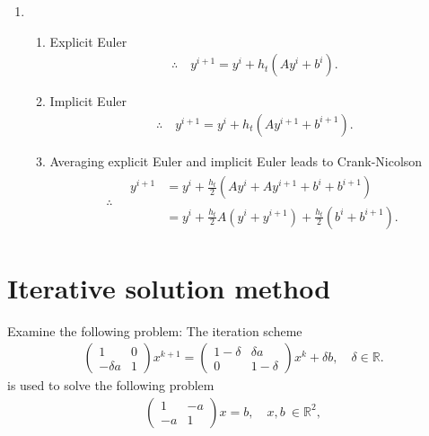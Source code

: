 \documentclass[12pt]{article}
\begin{document}
\begin{enumerate}
	\item
	      \begin{enumerate}
		      \item Explicit Euler
		            \begin{align*}
			            \therefore\quad
			            \boxed{
				            y^{i+1} = y^i + h_t \left( Ay^{i}+b^i \right).
			            }
		            \end{align*}
		            
		      \item Implicit Euler
		            \begin{align*}
			            \therefore\quad
			            \boxed{
				            y^{i+1} = y^i + h_t \left( Ay^{i+1}+b^{i+1} \right).
			            }
		            \end{align*}
		            
		      \item Averaging explicit Euler and implicit Euler leads to Crank-Nicolson
		            \begin{align*}
			            \therefore\quad\boxed{
				            \begin{aligned}
					            y^{i+1}
					             & = y^i + \frac{h_t}{2} \left( Ay^i+Ay^{i+1}+b^i+b^{i+1} \right)                  \\
					             & = y^i + \frac{h_t}{2} A (y^i+y^{i+1})+\frac{h_t}{2} \left( b^i+b^{i+1} \right).
				            \end{aligned}
			            }
		            \end{align*}
	      \end{enumerate}
\end{enumerate}

\newpage
\section{Iterative solution method}
\begin{example}
	Examine the following problem: The iteration scheme
	\begin{align*}
		\begin{pmatrix}
			1         & 0 \\
			-\delta a & 1
		\end{pmatrix}
		x^{k+1} =
		\begin{pmatrix}
			1-\delta & \delta a \\
			0        & 1-\delta
		\end{pmatrix}
		x^{k} + \delta b, \quad \delta \in \mathbb{R}.
	\end{align*}
	is used to solve the following problem 
	\begin{align*}
		\begin{pmatrix}
			1  & -a \\
			-a & 1
		\end{pmatrix}
		x = b, \quad x,b\ \in \mathbb{R}^2,
	\end{align*}
\end{example}
\end{document}
